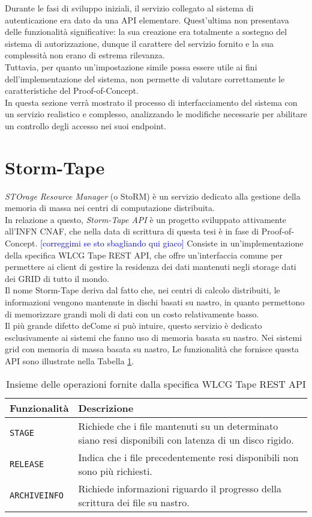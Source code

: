 Durante le fasi di sviluppo iniziali, il servizio collegato al sistema di autenticazione era dato da una API
elementare. Quest'ultima non presentava delle funzionalità significative: la sua creazione era totalmente 
a sostegno del sistema di autorizzazione, dunque il carattere del servizio fornito e la sua complessità non erano 
di estrema rilevanza.  
\\ Tuttavia, per quanto un'impostazione simile possa essere utile ai fini dell'implementazione del sistema, non 
permette di valutare correttamente le caratteristiche del Proof-of-Concept.
\\ In questa sezione verrà mostrato il processo di interfacciamento del sistema con un servizio 
realistico e complesso, analizzando le modifiche necessarie per abilitare un controllo degli accesso
nei suoi endpoint. 
\section{Storm-Tape}
\textit{STOrage Resource Manager} (o StoRM) è un servizio dedicato alla gestione della memoria 
di massa nei centri di computazione distribuita. \\ In relazione a questo, \textit{Storm-Tape API} è un progetto sviluppato
 attivamente all'INFN CNAF, che nella data di scrittura di questa tesi è in fase di Proof-of-Concept.
 \textcolor{blue}{[correggimi se sto sbagliando qui giaco]}
Consiste in un'implementazione della specifica {WLCG Tape REST API}, che offre un'interfaccia comune per permettere 
ai client di gestire la residenza dei dati mantenuti negli storage dati dei GRID di tutto il mondo. 
\\ Il nome Storm-Tape deriva dal fatto che, nei centri di calcolo distribuiti,
 le informazioni vengono mantenute in dischi basati su nastro, in quanto permettono di memorizzare 
grandi moli di dati con un costo relativamente basso. \\
Il più grande difetto deCome si può intuire, questo servizio è dedicato esclusivamente ai sistemi che fanno uso di memoria basata su nastro. 
Nei sistemi grid con memoria di massa basata su nastro, 
Le funzionalità che fornisce questa API sono illustrate nella Tabella \ref*{tab:table-name}.
\begin{table}
\begin{center}
\begin{tabular}{ | m{8em} | m{19em} | } 
  \hline
  \textbf{Funzionalità} & \textbf{Descrizione} \\ 
  \hline
  \texttt{STAGE} & Richiede che i file mantenuti su un determinato siano resi disponibili con latenza di un disco rigido. \\ 
  \hline
  \texttt{RELEASE} & Indica che i file precedentemente resi disponibili non sono più richiesti.   \\ 
  \hline
  \texttt{ARCHIVEINFO} & Richiede informazioni riguardo il progresso della scrittura dei file su nastro. \\ 
  \hline
\end{tabular}
\caption{\label{tab:table-name} Insieme delle operazioni fornite dalla specifica WLCG Tape REST API}
\end{center}
\end{table}
